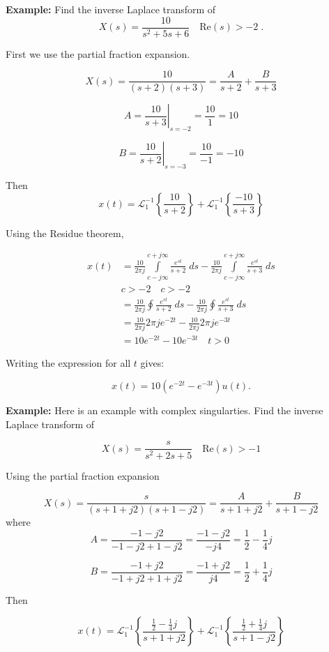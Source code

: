 \documentclass{article}
\begin{document}
\textbf{Example:} Find the inverse Laplace transform of
$$
X(s) = \frac{10}{s^{2} + 5s + 6} \quad \text{Re}(s) >-2 \; .
$$

First we use the partial fraction expansion.

\[
X(s) = \frac{10}{(s+2)(s+3)} =\frac{A}{s+2}+\frac{B}{s+3}
\]

\[
A=\left.\frac{10}{s+3}\right|_{s=-2}=\frac{10}{1}=10
\]

\[
B=\left.\frac{10}{s+2}\right|_{s=-3}=\frac{10}{-1}=-10
\]


Then
\[
x(t)=\mathcal{L}_{1}^{-1}\left\{\frac{10}{s+2}\right\}+\mathcal{L}_{1}^{-1}\left\{\frac{-10}{s+3}\right\}
\]

Using the Residue theorem,

$$
\begin{aligned}
x(t)&=\frac{10}{2 \pi j} \int\limits_{c-j\infty}^{c+j \infty} \frac{e^{s t}}{s+2} \; ds - \frac{10}{2 \pi j} \int\limits_{c-j \infty}^{c+j \infty} \frac{e^{s t}}{s+3} \; ds \\
& c>-2 \quad c>-2 \\
& =\frac{10}{2 \pi j} \oint \frac{e^{s t}}{s+2} \; d s - \frac{10}{2 \pi j} \oint \frac{e^{s t}}{s+3} \; ds \\
& =\frac{10}{2 \pi j} 2 \pi j e^{-2 t} - \frac{10}{2 \pi j} 2 \pi j e^{-3 t} \\
&=10 e^{-2 t}-10 e^{-3 t} \quad t>0
\end{aligned}
$$

Writing the expression for all $t$ gives:

\[
x(t)=10\left(e^{-2 t}-e^{-3 t}\right) u(t) .
\]

\textbf{Example:} Here is an example with complex singularties. Find the inverse Laplace transform of

$$
X(s)=\frac{s}{s^{2}+2 s+5} \quad \text{Re}(s)>-1
$$

Using the partial fraction expansion

\[
X(s) = \frac{s}{(s + 1 + j2)(s + 1 - j2)} = \frac{A}{s + 1 + j2} + \frac{B}{s + 1 - j2} 
\]
where
\[
A=\frac{-1-j2}{-1-j2+1-j2}=\frac{-1-j2}{-j4}=\frac{1}{2}-\frac{1}{4} j
\]

\[
B=\frac{-1+j2}{-1+j2+1+j2}=\frac{-1+j2}{j4}=\frac{1}{2}+\frac{1}{4} j
\]


Then

\[
x(t) = \mathcal{L}_{1}^{-1}\left\{\frac{\frac{1}{2}-\frac{1}{4} j}{s+1+j2}\right\}+\mathcal{L}_{1}^{-1}\left\{\frac{\frac{1}{2}+\frac{1}{4} j}{s+1-j2}\right\}
\]
\end{document}
